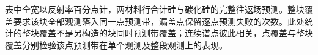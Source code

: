 \endgroup

表中全宽以反射率百分点计，两材料行合计硅与碳化硅的完整往返场预测。整块覆盖要求该块全部观测落入同一点预测带，漏盖点保留逐点预测失败的次数。此处统计的整块覆盖不是另构造的块同时预测带覆盖；连续谱点彼此相关，点覆盖与整块覆盖分别检验该点预测带在单个观测及整段观测上的表现。

